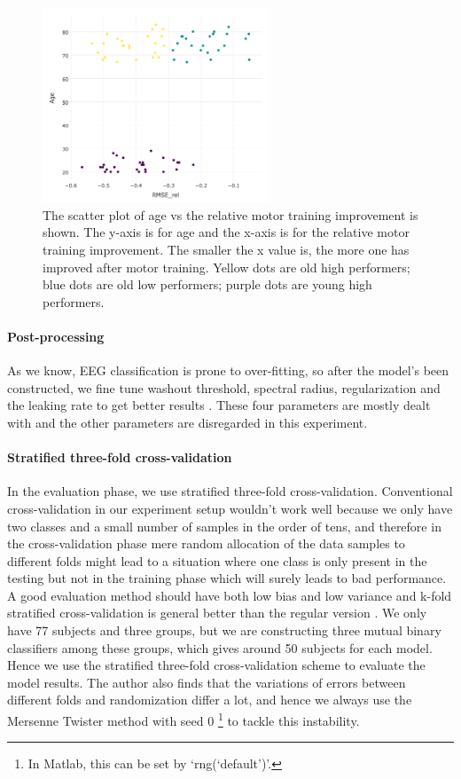 \documentclass[a4paper,11pt,oneside]{article}
\begin{document}
\begin{figure}[h]
	\centering
	\includegraphics[width=0.6\textwidth]{img/scatter}
	\caption{The scatter plot of age vs the relative motor training improvement is shown. The y-axis is for age and the x-axis is for the relative motor training improvement. The smaller the x value is, the more one has improved after motor training. Yellow dots are old high performers; blue dots are old low performers; purple dots are young high performers.}
\end{figure}

\paragraph{Post-processing}
As we know, EEG classification is prone to over-fitting, so after the model's been constructed, we fine tune  washout threshold, spectral radius, regularization and the leaking rate to get better results \cite{lukovsevivcius2012practical}. These four parameters are mostly dealt with and the other parameters are disregarded in this experiment.


\paragraph{Stratified three-fold cross-validation}
In the evaluation phase, we use stratified three-fold cross-validation. Conventional cross-validation in our experiment setup wouldn't work well because we only have two classes and a small number of samples in the order of tens, and therefore in the cross-validation phase mere random allocation of the data samples to different folds might lead to a situation where one class is only present in the testing but not in the training phase which will surely leads to bad performance. A good evaluation method should have both low bias and low variance and k-fold stratified cross-validation is general better than the regular version \cite{kohavi1995study}. We only have 77 subjects and three groups, but we are constructing three mutual binary classifiers among these groups, which gives around 50 subjects for each model. Hence we use the stratified three-fold cross-validation scheme to evaluate the model results. The author also finds that the variations of errors between different folds and randomization differ a lot, and hence we always use the Mersenne Twister method with seed 0 \footnote{In Matlab, this can be set by `rng(`default')'.} to tackle this instability. 
\end{document}
